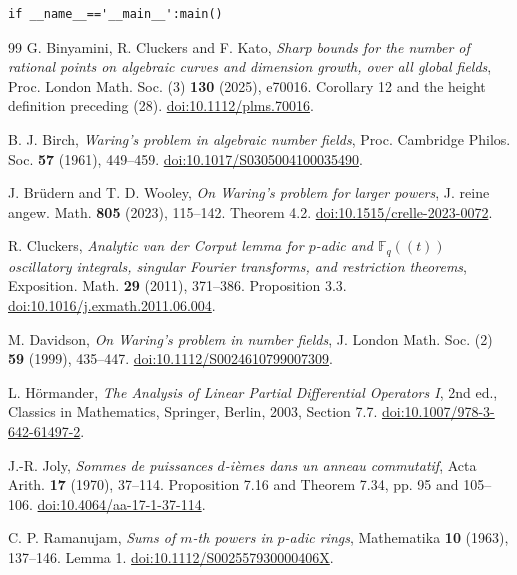 \documentclass[11pt,reqno]{amsart}
\numberwithin{equation}{section}
\theoremstyle{definition}
\begin{document}
\begin{lstlisting}
if __name__=='__main__':main()
\end{lstlisting}


\begin{thebibliography}{99}
G. Binyamini, R. Cluckers and F. Kato,
\emph{Sharp bounds for the number of rational points on algebraic curves and
dimension growth, over all global fields}, Proc. London Math. Soc. (3)
\textbf{130} (2025), e70016. Corollary 12 and the height definition preceding (28).
\href{https://doi.org/10.1112/plms.70016}{doi:10.1112/plms.70016}.

B. J. Birch, \emph{Waring's problem in algebraic number fields},
Proc. Cambridge Philos. Soc. \textbf{57} (1961), 449--459.
\href{https://doi.org/10.1017/S0305004100035490}{doi:10.1017/S0305004100035490}.

J. Br\"udern and T. D. Wooley, \emph{On Waring's problem for larger powers},
J. reine angew. Math. \textbf{805} (2023), 115--142. Theorem 4.2.
\href{https://doi.org/10.1515/crelle-2023-0072}{doi:10.1515/crelle-2023-0072}.

R. Cluckers, \emph{Analytic van der Corput lemma for $p$-adic and
$\mathbb F_q((t))$ oscillatory integrals, singular Fourier transforms,
and restriction theorems}, Exposition. Math. \textbf{29} (2011), 371--386.
Proposition 3.3.
\href{https://doi.org/10.1016/j.exmath.2011.06.004}{doi:10.1016/j.exmath.2011.06.004}.

M. Davidson, \emph{On Waring's problem in number fields},
J. London Math. Soc. (2) \textbf{59} (1999), 435--447.
\href{https://doi.org/10.1112/S0024610799007309}{doi:10.1112/S0024610799007309}.

L. H\"ormander, \emph{The Analysis of Linear Partial Differential Operators I},
2nd ed., Classics in Mathematics, Springer, Berlin, 2003, Section 7.7.
\href{https://doi.org/10.1007/978-3-642-61497-2}{doi:10.1007/978-3-642-61497-2}.

J.-R. Joly, \emph{Sommes de puissances $d$-i\`emes dans un anneau commutatif},
Acta Arith. \textbf{17} (1970), 37--114. Proposition 7.16 and
Theorem 7.34, pp. 95 and 105--106.
\href{https://doi.org/10.4064/aa-17-1-37-114}{doi:10.4064/aa-17-1-37-114}.

C. P. Ramanujam, \emph{Sums of $m$-th powers in $p$-adic rings},
Mathematika \textbf{10} (1963), 137--146. Lemma 1.
\href{https://doi.org/10.1112/S002557930000406X}{doi:10.1112/S002557930000406X}.


\end{thebibliography}
\end{document}
